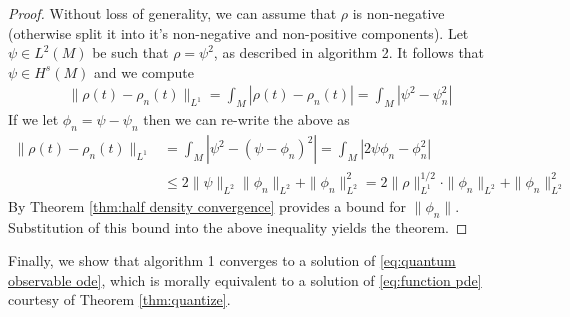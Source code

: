 \documentclass[12pt]{amsart}
\begin{document}
\begin{proof}
	Without loss of generality, we can assume that $\rho$ is non-negative (otherwise split it into it's non-negative and non-positive components).
	Let $\psi \in L^{2}(M)$ be such that $\rho =  \psi ^{2}$, as described in algorithm 2.
	It follows that $\psi \in H^{s}(M)$ and we compute
	\begin{align}
		\| \rho(t) - \rho_{n}(t) \|_{L^{1}} = \int_{M} | \rho(t) - \rho_{n}(t)| = \int_{M} | \psi^{2} - \psi_{n}^{2} |
	\end{align}
	If we let $\phi_{n} = \psi - \psi_{n}$ then we can re-write the above as
	\begin{align}
		\| \rho(t) - \rho_{n}(t) \|_{L^{1}}  &= \int_{M} | \psi^{2} - (\psi - \phi_{n})^{2} | = \int_{M} | 2 \psi \phi_{n} - \phi_{n}^{2} | \\
			&\leq 2 \| \psi \|_{L^{2}} \| \phi_{n}\|_{L^{2}} + \| \phi_{n} \|_{L^{2}}^{2} = 2 \| \rho \|_{L^{1}}^{1/2} \cdot \| \phi_{n} \|_{L^{2}} + \| \phi_{n} \|_{L^{2}}^{2}
	\end{align}
	By Theorem \ref{thm:half density convergence} provides a bound for $\| \phi_{n} \|$.
	Substitution of this bound into the above inequality yields the theorem.
\end{proof}

Finally, we show that algorithm 1 converges to a solution of \eqref{eq:quantum observable ode}, which is morally equivalent to a solution
of \eqref{eq:function pde} courtesy of Theorem \ref{thm:quantize}.
\end{document}
